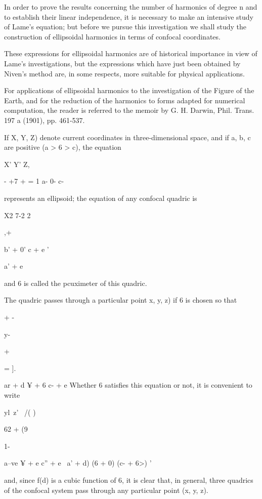 {{In order to prove the results concerning the number of harmonics of
degree n and to establish their linear independence, it is necessary
to make an intensive study of Lame's equation; but before we pursue
this investigation we shall study the construction of ellipsoidal
harmonics in terms of confocal coordinates.

%
%

These expressions for ellipsoidal harmonics are of historical
importance in view of Lame's investigations, but the expressions which
have just been obtained by Niven's method are, in some respects, more
suitable for physical applications.

For applications of ellipsoidal harmonics to the investigation of the
Figure of the Earth, and for the reduction of the harmonics to forms
adapted for numerical computation, the reader is referred to the
memoir by G. H. Darwin, Phil. Trans. 197 a (1901), pp. 461-537.


If X, Y, Z) denote current coordinates in three-dimensional space, and
if a, b, c are positive (a > 6 > c), the equation

X' Y' Z,

- +7 + = 1 a- 0- c-

represents an ellipsoid; the equation of any confocal quadric is

X2 7-2 2

,+

b' + 0' c + e '

a' + e

and 6 is called the pcuximeter of this quadric.

The quadric passes through a particular point x, y, z) if 6 is chosen
so that

+ -

y-

+

= ].

ar + d ¥ + 6 c- + e Whether 6 satisfies this equation or not, it is
convenient to write

  yl\ z' \ /( )

62 + (9

1-

a--ve ¥ + e c'' + e~ a' + d) (6 + 0) (c- + 6>) '

and, since f(d) is a cubic function of 6, it is clear that, in
general, three quadrics of the confocal system pass through any
particular point (x, y, z).

}}
